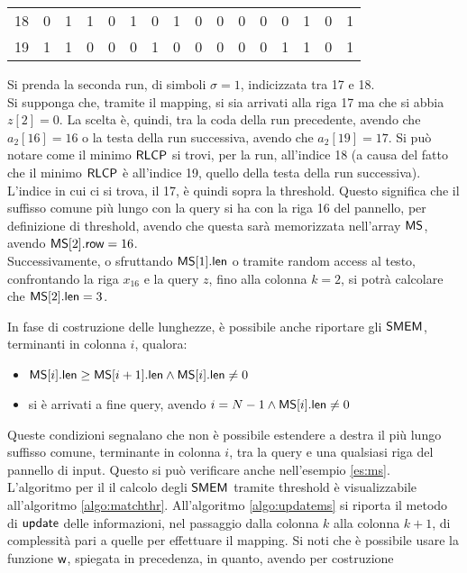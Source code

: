 \begin{esempio}
\begin{table}[H]
\begin{tabular}{c|cc|c|cccccccccccc}
      18 & 0 & 1 & 1 & 0 & 1 & 0 & 1 & 0 & 0 & 0 & 0 & 0 & 1 & 0 & 1 \\
      19 & 1 & 1 & 0 & 0 & 0 & 1 & 0 & 0 & 0 & 0 & 0 & 1 & 1 & 0 & 1 \\
    \end{tabular}
  \end{table}
  \noindent
  Si prenda la seconda run, di simboli $\sigma=1$, indicizzata tra 17 e 18. \\
  Si supponga che, tramite il mapping, si sia arrivati alla riga 17 ma che si
  abbia $z[2]=0$. La scelta è, quindi, tra la coda della run precedente, avendo
  che $a_2[16]=16$ o la testa della run successiva, avendo che $a_2[19]=17$. Si
  può notare come il minimo $\mbox{\rm {\sf RLCP}}$ si trovi, per la 
  run, all'indice 18 (a causa del fatto che il minimo $\mbox{\rm {\sf RLCP}}$ è all'indice
  19, quello della testa della run successiva). L'indice in cui ci si trova, il
  17, è quindi sopra la threshold.
  Questo significa che il suffisso comune più lungo
  con la query si ha 
  con la riga 16 del pannello, per definizione di threshold, avendo che questa
  sarà memorizzata nell'array $\mbox{\rm {\sf MS}}$, avendo $\mbox{\rm {\sf MS}}[2].\mbox{\rm {\sf row}}=16$.\\
  Successivamente, o sfruttando $\mbox{\rm {\sf MS}}[1].\mbox{\rm {\sf len}}$ o tramite random access al testo,
  confrontando la riga 
  $x_{16}$ e la query $z$, fino alla colonna $k=2$, si potrà calcolare che
  $\mbox{\rm {\sf MS}}[2].\mbox{\rm {\sf len}}=3$. 
\end{esempio}
In fase di costruzione delle lunghezze, è possibile anche riportare gli
$\mbox{\rm {\sf SMEM}}$, terminanti in colonna $i$, qualora:
\begin{itemize}
  \item $\mbox{\rm {\sf MS}}[i].\mbox{\rm {\sf len}}\geq \mbox{\rm {\sf MS}}[i+1].\mbox{\rm {\sf len}} \land \mbox{\rm {\sf MS}}[i].\mbox{\rm {\sf len}}\neq 0$
  \item si è arrivati a fine query, avendo $i=N-1\land \mbox{\rm {\sf MS}}[i].\mbox{\rm {\sf len}}\neq 0$
\end{itemize}
Queste condizioni segnalano che non è possibile estendere a destra il più lungo
suffisso comune, terminante in colonna $i$, tra la query e una qualsiasi riga del
pannello di input. 
Questo si può verificare anche nell'esempio \ref{es:ms}.\\
L'algoritmo per il il calcolo degli $\mbox{\rm {\sf SMEM}}$ tramite threshold è visualizzabile
all'algoritmo \ref{algo:matchthr}. All'algoritmo \ref{algo:updatems}
si riporta il metodo di $\mbox{\rm {\sf update}}$ delle informazioni, nel passaggio dalla
colonna 
$k$ alla colonna $k+1$, di complessità pari a quelle per effettuare il
mapping. Si noti che è 
possibile usare la funzione $\mbox{\rm {\sf w}}$, 
spiegata in precedenza, in quanto, avendo per costruzione

